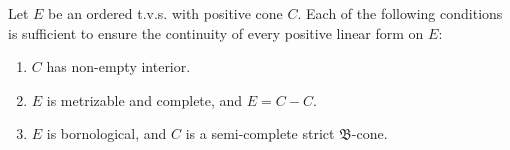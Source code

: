 Let $E$ be an ordered t.v.s. with positive cone $C$. Each of the following conditions is sufficient to ensure the continuity of every positive linear form on $E$:
\begin{enumerate}
  \item[(i)] $C$ has non-empty interior.
  \item[(ii)] $E$ is metrizable and complete, and $E = C - C$.
  \item[(iii)] $E$ is bornological, and $C$ is a semi-complete strict $\mathfrak{B}$-cone.
\end{enumerate}
